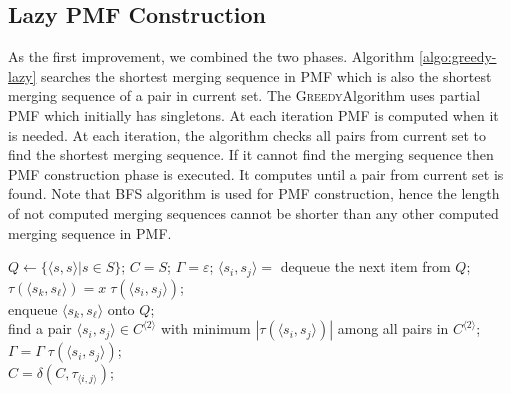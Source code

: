 \documentclass[12pt]{article}
\newcommand{\greedyAlgo}{\textsc{Greedy}}
\begin{document}
\subsection{Lazy PMF Construction}
\label{sec:lazy}

As the first improvement, we combined the two phases. Algorithm \ref{algo:greedy-lazy} searches the shortest merging sequence in PMF which is also the shortest merging sequence of a pair in current set. The \greedyAlgo Algorithm uses partial PMF which initially has singletons. At each iteration PMF is computed when it is needed. At each iteration, the algorithm checks all pairs from current set to find the shortest merging sequence. If it cannot find the merging sequence then PMF construction phase is executed. It computes until a pair from current set is found. Note that BFS algorithm is used for PMF construction, hence the length of not computed merging sequences cannot be shorter than any other computed merging sequence in PMF.
 
\begin{algorithm}[ht]	
	\label{algo:greedy-lazy}
	\caption{\greedyAlgo \space Algorithm with lazy PMF construction}
	$Q \longleftarrow \{ \langle s,s\rangle | s \in S \}$; 
	$C = S$; 
	$\Gamma = \varepsilon$; 
	{
		{
			$\langle s_i, s_j \rangle = $ dequeue the next item from $Q$;\\
			{
				{
					{
						$\tau(\langle s_k, s_\ell \rangle) = x \; \tau(\langle s_i, s_j\rangle)$;\\
						enqueue $\langle s_k,s_\ell \rangle$ onto $Q$;\\
					}
				}
			} 		
		}
		find a pair $\langle s_i,s_j \rangle \in C^{\langle 2 \rangle}$ 
		with minimum $|\tau(\langle s_i,s_j \rangle)|$ among all pairs 
		in $C^{\langle 2 \rangle}$;\\
		$\Gamma = \Gamma \; \tau(\langle s_i, s_j\rangle)$;\\
		$C = \delta(C,\tau_{\langle i,j\rangle})$;
	}
\end{algorithm}
\end{document}
